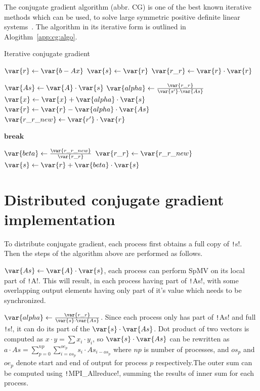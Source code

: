 \documentclass[thesis=M,english]{FITthesis}[2019/12/23]
\newcommand{\csre}[1]{\texttt!#1!}
\begin{document}
The conjugate gradient algorithm (abbr. CG) is one of the best known iterative methods which can be used, to solve large
symmetric positive definite linear systems~\cite{saad03:IMS}. The algorithm in its iterative form is outlined
in Alogithm~\ref{app:cg:algo}.

\begin{algorithm}
    \caption{Iterative conjugate gradient}\label{app:cg:algo}
    \begin{algorithmic}
        \State $\var{r} \gets \var{b - Ax}$
        \State $\var{s} \gets \var{r}$
        \State $\var{r\_r} \gets \var{r} \cdot \var{r}$

        \State $\var{As} \gets \var{A} \cdot \var{s}$
        \State $\var{alpha} \gets \frac{\var{r\_r}}{\var{s'} \cdot \var{As}} $
        \State $\var{x} \gets \var{x} + \var{alpha} \cdot \var{s}$
        \State $\var{r} \gets \var{r} - \var{alpha} \cdot \var{As}$
        \State $\var{r\_r\_new} \gets \var{r'} \cdot \var{r}$

        \State $\textbf{break}$
        \EndIf

        \State $\var{beta} \gets \frac{\var{r\_r\_new}}{\var{r\_r}}$
        \State $\var{r\_r} \gets \var{r\_r\_new}$
        \State $\var{s} \gets \var{r} + \var{beta} \cdot \var{s}$

        \EndFor

        \EndFunction
    \end{algorithmic}
\end{algorithm}

\section{Distributed conjugate gradient implementation}

To distribute conjugate gradient, each process first obtains a full copy of \csre{s}.
Then the steps of the algorithm above are performed as follows.

$\var{As} \gets \var{A} \cdot \var{s}$, each process can perform SpMV on its local part of
\csre{A}. This will result, in each process having part of \csre{As}, with some overlapping
output elements having only part of it's value which needs to be synchronized.

$\var{alpha} \gets \frac{\var{r\_r}}{\var{s} \cdot \var{As}}$. Since each process only has part of
\csre{As} and full \csre{s}, it can do its part of the $\var{s} \cdot \var{As}$.
Dot product of two vectors is computed as $x \cdot y = \sum x_i \cdot y_i$, so $\var{s} \cdot \var{As}$
can be rewritten as $a \cdot As = \sum_{p=0}^{np} \sum_{i=os_p}^{oe_p} s_i \cdot As_{i-os_p}$ where
$np$ is number of processes, and $os_p$ and $oe_p$ denote start and end of output for process
$p$ respectively.The outer sum can be computed using \csre{MPI_Allreduce},
summing the results of inner sum for each process.
\end{document}

